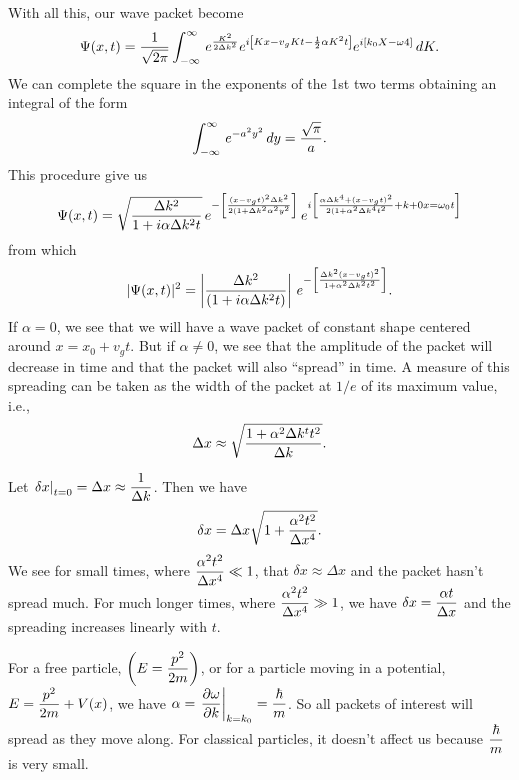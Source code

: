 With all this, our wave packet become
$$\Psi(x,t) = {1\over\sqrt{2\pi}}\int_{-\infty}^\infty\, e^{ {K^2\over2\Delta k^2}} e^{i\left[ Kx - v_gK t - {1\over2}\alpha K^2t\right]} e^{i[k_0X - \omega4]} \, dK.$$
We can complete the square in the exponents of the 1st two terms obtaining an integral of the form
$$\int_{-\infty}^{\infty}\, e^{-a^2y^2}\, dy = { \sqrt{\pi}\over a}.$$
This procedure give us 
$$\Psi(x,t) = \sqrt{ {\Delta k^2\over 1 + i\alpha\Delta k^2 t}} \, e^{-\left[ {(x-v_gt)^2\Delta k^2\over 2(1+ \Delta k^2 \alpha^2y^2}\right]} \, e^{i\left[ {\alpha\Delta k^4+(x - v_gt)^2\over 2(1+\alpha^2\Delta k^4 t^2} + k+0x=\omega_0 t\right]}$$
from which $$ |\Psi(x,t)|^2 = \left| {\Delta k^2\over (1+ i\alpha\Delta k^2 t)}\right| \, e^{-\left[{\Delta k^2(x-v_gt)^2\over 1 + \alpha^2\Delta k^2 t^2}\right]}.$$
If $\alpha = 0$, we see that we will have a wave packet of constant shape centered around $x = x_0 + v_g t$. But if $\alpha\ne 0$, we see that the amplitude of the packet will decrease in time and that the packet will also ``spread'' in time. 
A measure of this spreading can be taken as the width of the packet at $1/e$ of its maximum value, i.e., $$\Delta x\approx {\sqrt{1 + \alpha^2\Delta k^t t^2\over \Delta k}}.$$

Let $\displaystyle \left. \delta x\right|_{t=0} = \Delta x \approx {1\over \Delta k}$. Then we have 
$$\delta x = \Delta x\sqrt{ 1 + {\alpha^2t^2\over \Delta x^4}}.$$
We see for small times, where $\displaystyle {\alpha^2 t^2\over \Delta x^4} \ll 1$, that $\delta x \approx \Delta x$ and the packet hasn't spread much. For much longer times, where $\displaystyle {\alpha^2t^2\over \Delta x^4}\gg 1$, we have
$\displaystyle \delta x = {\alpha t \over \Delta x}$ and the spreading increases linearly with $t$.

For a free particle, $\displaystyle \left(E = {p^2\over2m}\right)$, or for a particle moving in a potential, $\displaystyle E = {p^2\over2m} + V(x)$, we have $\displaystyle \alpha = \left. {\partial \omega\over\partial k}\right|_{k=k_0} = {\hbar\over m}$. So all packets of interest will spread as they move along. For classical particles, it doesn't affect us because $\displaystyle {\hbar\over m}$ is very small. 